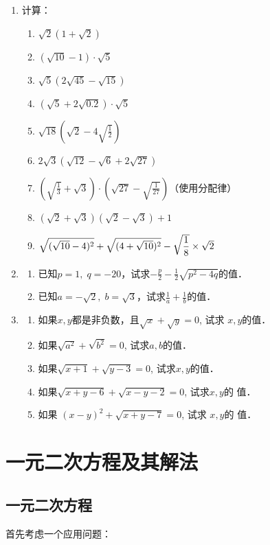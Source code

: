 \begin{enumerate}
\item 计算：
\begin{enumerate}
    \item $\sqrt{2}(1+\sqrt{2})$
    \item $(\sqrt{10}-1)\cdot \sqrt{5}$
    \item $\sqrt{5}(2\sqrt{45}-\sqrt{15})$
    \item $(\sqrt{5}+2\sqrt{0.2})\cdot \sqrt{5}$
    \item $\sqrt{18}\left(\sqrt{2}-4\sqrt{\frac{1}{2}}\right)$
    \item $2\sqrt{3}\left(\sqrt{12}-\sqrt{6}+2\sqrt{27}\right)$
    \item $\left(\sqrt{\frac{1}{3}}+\sqrt{3}\right)\cdot \left(\sqrt{27}-\sqrt{\frac{1}{27}}\right)$\quad（使用分配律）
    \item $(\sqrt{2}+\sqrt{3})(\sqrt{2}-\sqrt{3})+1$
    \item $\sqrt{(\sqrt{10}-4)^2}+\sqrt{(4+\sqrt{10})^2}-\sqrt{\dfrac{1}{8}}\times \sqrt{2}$
\end{enumerate}

\item \begin{enumerate}
    \item 已知$p=1, \; q=-20$，试求$-\frac{p}{2}-\frac{1}{2}\sqrt{p^2-4q}$的值．
    \item 已知$a=-\sqrt{2},\; b=\sqrt{3}$，试求$\frac{1}{a}+\frac{1}{b}$的值． 
\end{enumerate}

\item \begin{enumerate}
    \item 如果$x,y$都是非负数，且$\sqrt{x}+\sqrt{y}=0$, 试求
$x,y$的值．
\item 如果$\sqrt{a^2}+\sqrt{b^2}=0$, 试求$a,b$的值．
\item 如果$\sqrt{x+1}+\sqrt{y-3}=0$, 试求$x,y$的值．
\item 如果$\sqrt{x+y-6}+\sqrt{x-y-2}=0$, 试求$x,y$的
值．
\item 如果
$(x-y)^2+\sqrt{x+y-7}=0$, 试求 $x,y$的
值．
\end{enumerate}

\end{enumerate}

\section{一元二次方程及其解法}
\subsection{一元二次方程}
首先考虑一个应用问题：

